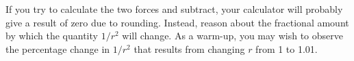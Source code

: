 If you try to calculate the two forces and subtract,
your calculator will probably give a result of zero due to
rounding. Instead, reason about the fractional amount by
which the quantity $1/r^2$ will change. As a warm-up, you
may wish to observe the percentage change in $1/r^2$ that
results from changing $r$ from 1 to 1.01.
